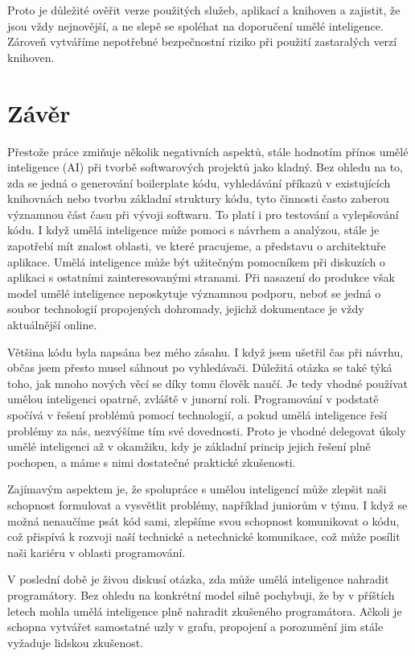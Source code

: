 \documentclass[FM,DP]{tulthesis}
\begin{document}
		Proto je důležité ověřit verze použitých služeb, aplikací a knihoven a zajistit, že jsou vždy nejnovější, a ne slepě se spoléhat na doporučení umělé inteligence. Zároveň vytváříme nepotřebné bezpečnostní riziko při použití zastaralých verzí knihoven.
		
		
		\chapter{Závěr} 
		Přestože práce zmiňuje několik negativních aspektů, stále hodnotím přínos umělé inteligence (AI) při tvorbě softwarových projektů jako kladný. Bez ohledu na to, zda se jedná o generování boilerplate kódu, vyhledávání příkazů v existujících knihovnách nebo tvorbu základní struktury kódu, tyto činnosti často zaberou významnou část času při vývoji softwaru. To platí i pro testování a vylepšování kódu. I když umělá inteligence může pomoci s návrhem a analýzou, stále je zapotřebí mít znalost oblasti, ve které pracujeme, a představu o architektuře aplikace. Umělá inteligence může být užitečným pomocníkem při diskuzích o aplikaci s ostatními zainteresovanými stranami. Při nasazení do produkce však model umělé inteligence neposkytuje významnou podporu, neboť se jedná o soubor technologií propojených dohromady, jejichž dokumentace je vždy aktuálnější online.
		
		Většina kódu byla napsána bez mého zásahu. I když jsem ušetřil čas při návrhu, občas jsem přesto musel sáhnout po vyhledávači. Důležitá otázka se také týká toho, jak mnoho nových věcí se díky tomu člověk naučí. Je tedy vhodné používat umělou inteligenci opatrně, zvláště v junorní roli. Programování v podstatě spočívá v řešení problémů pomocí technologií, a pokud umělá inteligence řeší problémy za nás, nezvýšíme tím své dovednosti. Proto je vhodné delegovat úkoly umělé inteligenci až v okamžiku, kdy je základní princip jejich řešení plně pochopen, a máme s nimi dostatečné praktické zkušenosti.
		
		Zajímavým aspektem je, že spolupráce s umělou inteligencí může zlepšit naši schopnost formulovat a vysvětlit problémy, například juniorům v týmu. I když se možná nenaučíme psát kód sami, zlepšíme svou schopnost komunikovat o kódu, což přispívá k rozvoji naší technické a netechnické komunikace, což může posílit naši kariéru v oblasti programování.
		
		V poslední době je živou diskusí otázka, zda může umělá inteligence nahradit programátory. Bez ohledu na konkrétní model silně pochybuji, že by v příštích letech mohla umělá inteligence plně nahradit zkušeného programátora. Ačkoli je schopna vytvářet samostatné uzly v grafu, propojení a porozumění jim stále vyžaduje lidskou zkušenost. 
		
\end{document}

